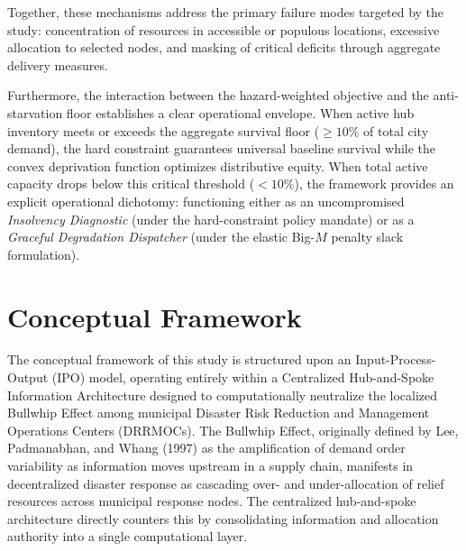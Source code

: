 Together, these mechanisms address the primary failure modes targeted by the study: concentration of resources in accessible or populous locations, excessive allocation to selected nodes, and masking of critical deficits through aggregate delivery measures.

Furthermore, the interaction between the hazard-weighted objective and the anti-starvation floor establishes a clear operational envelope. When active hub inventory meets or exceeds the aggregate survival floor ($\ge 10\%$ of total city demand), the hard constraint guarantees universal baseline survival while the convex deprivation function optimizes distributive equity. When total active capacity drops below this critical threshold ($< 10\%$), the framework provides an explicit operational dichotomy: functioning either as an uncompromised \textit{Insolvency Diagnostic} (under the hard-constraint policy mandate) or as a \textit{Graceful Degradation Dispatcher} (under the elastic Big-$M$ penalty slack formulation).


\section{Conceptual Framework}
The conceptual framework of this study is structured upon an Input-Process-Output (IPO) model, operating entirely within a Centralized Hub-and-Spoke Information Architecture designed to computationally neutralize the localized Bullwhip Effect among municipal Disaster Risk Reduction and Management Operations Centers (DRRMOCs). The Bullwhip Effect, originally defined by Lee, Padmanabhan, and Whang (1997) \cite{lee1997information} as the amplification of demand order variability as information moves upstream in a supply chain, manifests in decentralized disaster response as cascading over- and under-allocation of relief resources across municipal response nodes. The centralized hub-and-spoke architecture directly counters this by consolidating information and allocation authority into a single computational layer.

